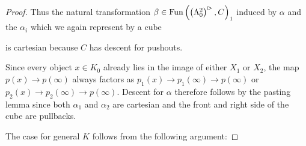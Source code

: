 \begin{lemma}
\begin{proof}
        Thus the natural transformation $\beta\in\operatorname{Fun}\left(\left(\Lambda_0^2\right)^{\rhd}, C\right)_1$ induced by $\alpha$ and the $\alpha_i$ which we again represent by a cube
        \begin{center}
        \end{center}
        is cartesian because $C$ has descent for pushouts.

        Since every object $x\in K_0$ already lies in the image of either $X_1$ or $X_2$, the map $p(x)\to p(\infty)$ always factors as $p_1(x)\to p_1(\infty)\to p(\infty)$ or $p_2(x)\to p_2(\infty)\to p(\infty)$.
        Descent for $\alpha$ therefore follows by the pasting lemma since both $\alpha_1$ and $\alpha_2$ are cartesian and the front and right side of the cube are pullbacks.

        The case for general $K$ follows from the following argument:


\end{proof}
\end{lemma}
